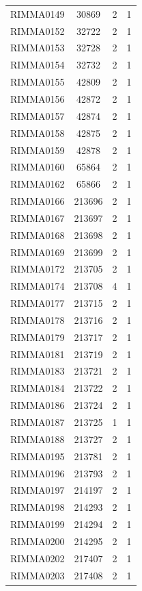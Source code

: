 \documentclass[11pt]{article}
\newcounter{rowno}
\begin{document}
\begin{scriptsize}
\begin{longtable}{>{\stepcounter{rowno}}cccc}
    RIMMA0149 & 30869 & 2     & 1 \\
    RIMMA0152 & 32722 & 2     & 1 \\
    RIMMA0153 & 32728 & 2     & 1 \\
    RIMMA0154 & 32732 & 2     & 1 \\
    RIMMA0155 & 42809 & 2     & 1 \\
    RIMMA0156 & 42872 & 2     & 1 \\
    RIMMA0157 & 42874 & 2     & 1 \\
    RIMMA0158 & 42875 & 2     & 1 \\
    RIMMA0159 & 42878 & 2     & 1 \\
    RIMMA0160 & 65864 & 2     & 1 \\
    RIMMA0162 & 65866 & 2     & 1 \\
    RIMMA0166 & 213696 & 2     & 1 \\
    RIMMA0167 & 213697 & 2     & 1 \\
    RIMMA0168 & 213698 & 2     & 1 \\
    RIMMA0169 & 213699 & 2     & 1 \\
    RIMMA0172 & 213705 & 2     & 1 \\
    RIMMA0174 & 213708 & 4     & 1 \\
    RIMMA0177 & 213715 & 2     & 1 \\
    RIMMA0178 & 213716 & 2     & 1 \\
    RIMMA0179 & 213717 & 2     & 1 \\
    RIMMA0181 & 213719 & 2     & 1 \\
    RIMMA0183 & 213721 & 2     & 1 \\
    RIMMA0184 & 213722 & 2     & 1 \\
    RIMMA0186 & 213724 & 2     & 1 \\
    RIMMA0187 & 213725 & 1     & 1 \\
    RIMMA0188 & 213727 & 2     & 1 \\
    RIMMA0195 & 213781 & 2     & 1 \\
    RIMMA0196 & 213793 & 2     & 1 \\
    RIMMA0197 & 214197 & 2     & 1 \\
    RIMMA0198 & 214293 & 2     & 1 \\
    RIMMA0199 & 214294 & 2     & 1 \\
    RIMMA0200 & 214295 & 2     & 1 \\
    RIMMA0202 & 217407 & 2     & 1 \\
    RIMMA0203 & 217408 & 2     & 1 \\

\end{longtable}
\end{scriptsize}
\end{document}
